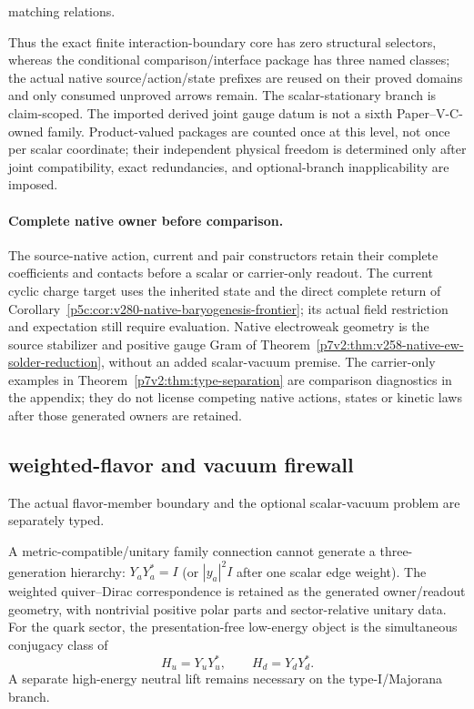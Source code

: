 \documentclass[12pt,a4paper]{article}
\begin{document}
\begin{definition}
\begin{enumerate}[label=(\roman*),leftmargin=2.5em]
 matching relations.
\end{enumerate}
Thus the exact finite interaction-boundary core has zero structural selectors,
whereas the conditional comparison/interface package has three named classes;
the actual native source/action/state prefixes are reused on their proved
domains and only consumed unproved arrows remain.  The scalar-stationary
branch is claim-scoped.  The imported derived joint gauge datum is not
a sixth Paper--V-C-owned family.  Product-valued packages are counted once at this level, not once per
scalar coordinate; their independent physical freedom is determined only
after joint compatibility, exact redundancies, and optional-branch
inapplicability are imposed.
\end{definition}

\paragraph{Complete native owner before comparison.}
\label{p5c:rem:v2187-complete-owner-before-comparison}
The source-native action, current and pair constructors retain their complete
coefficients and contacts before a scalar or carrier-only readout.  The
current cyclic charge target uses the inherited state and the direct complete
return of Corollary~\ref{p5c:cor:v280-native-baryogenesis-frontier}; its
actual field restriction and expectation still require evaluation.  Native
electroweak geometry is the source stabilizer and positive gauge Gram of
Theorem~\ref{p7v2:thm:v258-native-ew-solder-reduction}, without an added
scalar-vacuum premise.  The carrier-only examples in
Theorem~\ref{p7v2:thm:type-separation} are comparison diagnostics in the
appendix; they do not license competing native actions, states or kinetic
laws after those generated owners are retained.

\label{p7v2:part:gauge-em}

\subsection{weighted-flavor and vacuum firewall}
\label{p7:sec:post-v125-flavor-vacuum}

The actual flavor-member boundary and the optional scalar-vacuum problem are separately typed.

A metric-compatible/unitary family connection cannot generate a
three-generation hierarchy: $Y_aY_a^*=I$ (or $|y_a|^2I$ after one scalar edge
weight).  The weighted quiver--Dirac correspondence is retained as the generated owner/readout geometry, with
nontrivial positive polar parts and sector-relative unitary data.  For the
quark sector, the presentation-free low-energy object is the simultaneous
conjugacy class of
\[
 H_u=Y_uY_u^*,\qquad H_d=Y_dY_d^*.
\]
A separate high-energy neutral lift remains necessary on the type-I/Majorana
branch.
\end{document}

